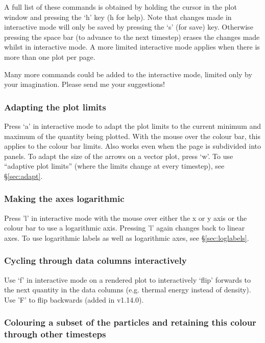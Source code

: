 \documentclass[a4paper,10pt]{article}
\begin{document}
 A full list of these commands is obtained by holding
the cursor in the plot window and pressing the `h' key (h for help). Note that changes made in interactive mode will only be saved by pressing the
`s' (for save) key. Otherwise pressing the space bar (to advance to the next
timestep) erases the changes made whilst in interactive mode. A more limited
interactive mode applies when there is more than one plot per page.

 Many more commands could be added to
the interactive mode, limited only by your imagination. Please send me your suggestions!

\subsubsection{ Adapting the plot limits}
 Press `a' in interactive mode to adapt the plot limits to the current minimum and maximum of the quantity being plotted. With the mouse over the colour bar, this applies to the colour bar limits. Also works even when the page is subdivided into panels. To adapt the size of the arrows on a vector plot, press `w'. To use ``adaptive plot limits'' (where the limits change at every timestep), see \S\ref{sec:adapt}.

\subsubsection{ Making the axes logarithmic}
 Press 'l' in interactive mode with the mouse over either the x or y axis or the colour bar to use a logarithmic axis. Pressing 'l' again changes back to linear axes. To use logarithmic labels as well as logarithmic axes, see \S\ref{sec:loglabels}.

\subsubsection{Cycling through data columns interactively}
 Use `f' in interactive mode on a rendered plot to interactively `flip' forwards to the next quantity in the data columns (e.g. thermal energy instead of density). Use 'F' to flip backwards (added in v1.14.0).

\subsubsection{ Colouring a subset of the particles and retaining this colour through other timesteps}
\label{sec:colourparts}
\end{document}
